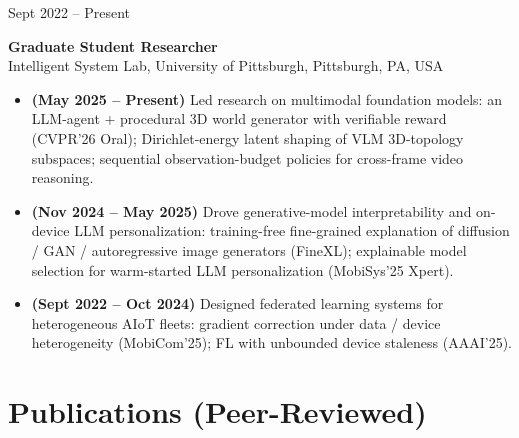 \documentclass[11pt, letterpaper]{article}
\newenvironment{datedentry}[1]{%
  \par\noindent
  \begin{minipage}[t]{2.8cm}\raggedright\small #1\end{minipage}%
  \hspace{0.3cm}%
  \begin{minipage}[t]{\dimexpr\linewidth-3.1cm\relax}\raggedright
}{\end{minipage}\par\medskip}
\begin{document}
\begin{datedentry}{Sept 2022 -- Present}
\textbf{Graduate Student Researcher}\\
Intelligent System Lab, University of Pittsburgh, Pittsburgh, PA, USA
\begin{itemize}[leftmargin=1.1em, itemsep=2pt, topsep=3pt]
  \item \textbf{(May 2025 -- Present)} Led research on multimodal foundation models: an LLM-agent + procedural 3D world generator with verifiable reward (CVPR'26 Oral); Dirichlet-energy latent shaping of VLM 3D-topology subspaces; sequential observation-budget policies for cross-frame video reasoning.
  \item \textbf{(Nov 2024 -- May 2025)} Drove generative-model interpretability and on-device LLM personalization: training-free fine-grained explanation of diffusion / GAN / autoregressive image generators (FineXL); explainable model selection for warm-started LLM personalization (MobiSys'25 Xpert).
  \item \textbf{(Sept 2022 -- Oct 2024)} Designed federated learning systems for heterogeneous AIoT fleets: gradient correction under data / device heterogeneity (MobiCom'25); FL with unbounded device staleness (AAAI'25).
\end{itemize}
\end{datedentry}

\section{Publications (Peer-Reviewed)}
\end{document}
